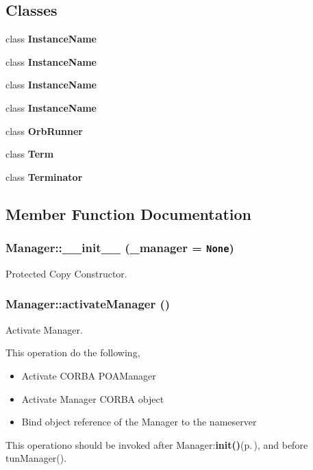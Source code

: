 \subsection*{Classes}
\begin{CompactItemize}
\item 
class {\bf Instance\-Name}
\item 
class {\bf Instance\-Name}
\item 
class {\bf Instance\-Name}
\item 
class {\bf Instance\-Name}
\item 
class {\bf Orb\-Runner}
\item 
class {\bf Term}
\item 
class {\bf Terminator}
\end{CompactItemize}


\subsection{Member Function Documentation}
\subsubsection{\setlength{\rightskip}{0pt plus 5cm}Manager::\_\-\_\-init\_\-\_\- (\_\-manager = {\tt None})}\label{classManager_Managera0}


Protected Copy Constructor. 

\subsubsection{\setlength{\rightskip}{0pt plus 5cm}Manager::activate\-Manager ()}\label{classManager_Managera5}


Activate Manager. 

This operation do the following,\begin{itemize}
\item Activate CORBA POAManager\item Activate Manager CORBA object\item Bind object reference of the Manager to the nameserver\end{itemize}


This operationo should be invoked after Manager:{\bf init()}{\rm (p.\,\pageref{classManager_Managere0})}, and before tun\-Manager().
